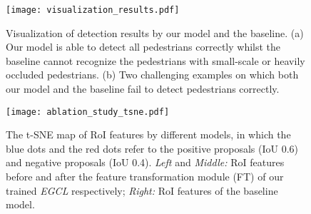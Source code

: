 \documentclass[journal]{IEEEtran}
\newcommand{\lincomment}[1]{\textcolor[rgb]{1,0,1} {#1}}
\begin{document}
\begin{comment}
\subsubsection{Effect of the exemplar dictionary on heavy-occluded subsets}
\lincomment{Detecting the heavy-occluded pedestrians is a critical challenge in the field of pedestrian detection. Due to the construction of exemplar dictionary, our model can spare much capacity to deal with the appearance diversities of pedestrians. Thus, the distribution of the exemplar dictionary determines the bias of our contrastive learning model. 
However, after we visualize all the exemplars in the constructed exemplar dictionary, we observe that the Reasonable samples account for about \% of the exemplar dictionary that is consistent with the distribution of pedestrians in real-world scenarios. This phenomenon makes our model unable to deal with heavy-occluded pedestrians well.  
To investigate the effect of the exemplar dictionary on heavy-occluded subsets, we conduct experiment by increasing the occluded samples in the exemplar dictionary by simply replicating the existing occluded exemplars. As shown in Table \ref{tab:effect_occluded_ratio}, for CityPersons dataset, the performance of our model on \textbf{HO} and \textbf{R+HO} is indeed improved as the increase of the occluded exemplars, which demonstrates that our contrastive learning model is able to effectively handle occlusion of pedestrians. However, too large ratio of occluded exemplars would degrade the performance on \textbf{R} subset.}
\end{comment}

\begin{figure*}[!t]
\centering
    \texttt{[image: visualization\_results.pdf]}
\caption{Visualization of detection results by our model and the baseline. (a) Our model is able to detect all pedestrians correctly whilst the baseline cannot recognize the pedestrians with small-scale or heavily occluded pedestrians. (b) Two challenging examples on which both our model and the baseline fail to detect pedestrians correctly.}
\label{Fig:visualization_results}
\end{figure*}
\begin{figure}[!t]
\centering
    \texttt{[image: ablation\_study\_tsne.pdf]}
\caption{The t-SNE map of RoI features by different models, in which the blue dots and the red dots refer to the positive proposals (IoU  0.6) and negative proposals (IoU  0.4). \emph{Left} and \emph{Middle:} RoI features before and after the feature transformation module (FT) of our trained \emph{EGCL} respectively; \emph{Right:} RoI features of the baseline model.} 
\label{Fig:ped_back_tsne}
\end{figure}
\end{document}
